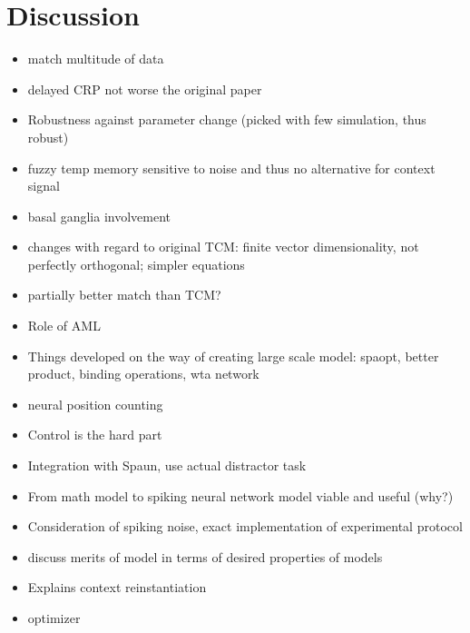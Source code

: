 \chapter{Discussion}
\begin{itemize}
    \item match multitude of data
    \item delayed CRP not worse the original paper
    \item Robustness against parameter change (picked with few simulation, thus robust)
    \item fuzzy temp memory sensitive to noise and thus no alternative for context signal
    \item basal ganglia involvement
    \item changes with regard to original TCM\@: finite vector dimensionality, not perfectly orthogonal; simpler equations
    \item partially better match than TCM\@?
    \item Role of AML
    \item Things developed on the way of creating large scale model: spaopt, better product, binding operations, wta network
    \item neural position counting
    \item Control is the hard part
    \item Integration with Spaun, use actual distractor task
    \item From math model to spiking neural network model viable and useful (why?)
    \item Consideration of spiking noise, exact implementation of experimental protocol
    \item discuss merits of model in terms of desired properties of models
    \item Explains context reinstantiation
    \item optimizer
\end{itemize}
